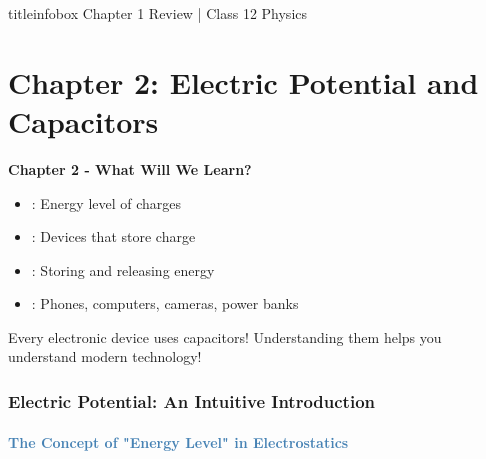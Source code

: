 \begin{frame}
\begin{frame}
\vfill

\begin{beamercolorbox}[wd=\textwidth,ht=0.5cm,dp=0.1cm,center]{titleinfobox}
    \small\color{coolgray} Chapter 1 Review | Class 12 Physics
\end{beamercolorbox}
\end{frame}








\section{Chapter 2: Electric Potential and Capacitors}

\begin{frame}{\textbf{Chapter 2 - What Will We Learn?}}

\begin{keybox}
\begin{itemize}
    \item {}: Energy level of charges
    \item {}: Devices that store charge
    \item {}: Storing and releasing energy
    \item {}: Phones, computers, cameras, power banks
\end{itemize}
\end{keybox}

\vspace{0.3cm}

\begin{importantbox}
Every electronic device uses capacitors! Understanding them helps you understand modern technology!
\end{importantbox}
\end{frame}

\begin{frame}
\frametitle{\textsf{\textbf{Electric Potential:} An Intuitive Introduction}}
\framesubtitle{\textcolor{steelblue}{The Concept of "Energy Level" in Electrostatics}}

\vspace{-0.05cm}


\end{frame}
\end{frame}

